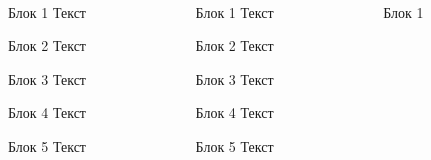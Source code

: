 \begin{frame}{}
\
\vspace{-3cm} %
	\begin{columns}[t]  %
		\begin{column}{.32\linewidth}  %
			\begin{block}{Блок 1}
				Текст
				\vspace{10cm}
			\end{block}
			\begin{block}{Блок 2}
				Текст
				\vspace{10cm}
			\end{block}
			\begin{block}{Блок 3}
				Текст
				\vspace{10cm}
			\end{block}
			\begin{block}{Блок 4}
				Текст
				\vspace{10cm}
			\end{block}
			\begin{block}{Блок 5}
				Текст
				\vspace{10cm}
			\end{block}
		\end{column}
		\begin{column}{0.32\linewidth}
			\begin{block}{Блок 1}
				Текст
				\vspace{10cm}
			\end{block}
			\begin{block}{Блок 2}
				Текст
				\vspace{10cm}
			\end{block}
			\begin{block}{Блок 3}
				Текст
				\vspace{10cm}
			\end{block}
			\begin{block}{Блок 4}
				Текст
				\vspace{10cm}
			\end{block}
			\begin{block}{Блок 5}
				Текст
				\vspace{10cm}
			\end{block}
		\end{column}
		\begin{column}{0.32\linewidth}
			\begin{block}{Блок 1}

\end{block}
\end{column}
\end{columns}
\end{frame}
